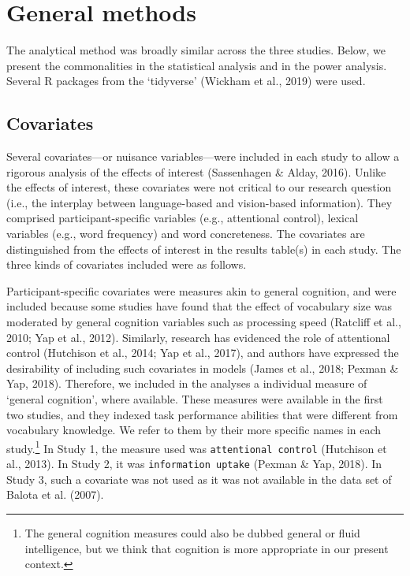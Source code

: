 \documentclass[
  12pt,
  man,floatsintext]{apa7}
\begin{document}
\hypertarget{general-methods}{%
\section{General methods}\label{general-methods}}

The analytical method was broadly similar across the three studies. Below, we present the commonalities in the statistical analysis and in the power analysis. Several R packages from the `tidyverse' (Wickham et al., 2019) were used.

\hypertarget{covariates}{%
\subsection{Covariates}\label{covariates}}

Several covariates---or nuisance variables---were included in each study to allow a rigorous analysis of the effects of interest (Sassenhagen \& Alday, 2016). Unlike the effects of interest, these covariates were not critical to our research question (i.e., the interplay between language-based and vision-based information). They comprised participant-specific variables (e.g., attentional control), lexical variables (e.g., word frequency) and word concreteness. The covariates are distinguished from the effects of interest in the results table(s) in each study. The three kinds of covariates included were as follows.

Participant-specific covariates were measures akin to general cognition, and were included because some studies have found that the effect of vocabulary size was moderated by general cognition variables such as processing speed (Ratcliff et al., 2010; Yap et al., 2012). Similarly, research has evidenced the role of attentional control (Hutchison et al., 2014; Yap et al., 2017), and authors have expressed the desirability of including such covariates in models (James et al., 2018; Pexman \& Yap, 2018). Therefore, we included in the analyses a individual measure of `general cognition', where available. These measures were available in the first two studies, and they indexed task performance abilities that were different from vocabulary knowledge. We refer to them by their more specific names in each study.\footnote{The general cognition measures could also be dubbed general or fluid intelligence, but we think that cognition is more appropriate in our present context.} In Study 1, the measure used was \texttt{attentional\ control} (Hutchison et al., 2013). In Study 2, it was \texttt{information\ uptake} (Pexman \& Yap, 2018). In Study 3, such a covariate was not used as it was not available in the data set of Balota et al. (2007).
\end{document}
